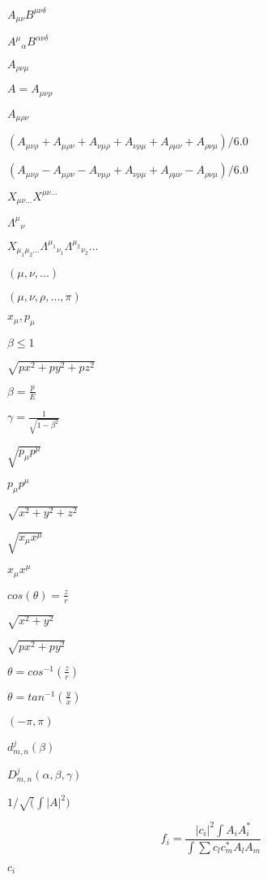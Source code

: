 \documentclass{article}
\begin{document}
$ A_{\mu\nu} B^{\mu\nu\delta} $
\pagebreak

$ A^{\mu}{}_{\alpha} B^{\alpha\nu\delta} $
\pagebreak

$ A_{\rho\nu\mu} $
\pagebreak

$ A = A_{\mu\nu\rho} $
\pagebreak

$ A_{\mu\rho\nu} $
\pagebreak

$ (A_{\mu\nu\rho} + A_{\mu\rho\nu} + A_{\nu\mu\rho} + A_{\nu\rho\mu} + A_{\rho\mu\nu} + A_{\rho\nu\mu})/6.0 $
\pagebreak

$ (A_{\mu\nu\rho} - A_{\mu\rho\nu} - A_{\nu\mu\rho} + A_{\nu\rho\mu} + A_{\rho\mu\nu} - A_{\rho\nu\mu})/6.0 $
\pagebreak

$ X_{\mu\nu...} X^{\mu\nu...} $
\pagebreak

$ \Lambda^{\mu}{}_{\nu}$
\pagebreak

$ X_{\mu_1 \mu_2 ...} \Lambda^{\mu_1}{}_{\nu_1} \Lambda^{\mu_2}{}_{\nu_2} ... $
\pagebreak

$(\mu,\nu,...)$
\pagebreak

$ (\mu,\nu,\rho,...,\pi) $
\pagebreak

$ x_{\mu}, p_{\mu} $
\pagebreak

$ \beta \leq 1 $
\pagebreak

$\sqrt{px^2 + py^2 + pz^2}$
\pagebreak

$ \beta = \frac{p}{E} $
\pagebreak

$ \gamma = \frac{1}{\sqrt{1 - \beta^2}} $
\pagebreak

$ \sqrt{p_{\mu} p^{\mu}} $
\pagebreak

$ p_{\mu} p^{\mu} $
\pagebreak

$\sqrt{x^2 + y^2 + z^2}$
\pagebreak

$ \sqrt{x_{\mu} x^{\mu}} $
\pagebreak

$ x_{\mu} x^{\mu} $
\pagebreak

$ cos(\theta) = \frac{z}{r} $
\pagebreak

$\sqrt{x^2 + y^2}$
\pagebreak

$\sqrt{px^2 + py^2}$
\pagebreak

$ \theta = cos^{-1}(\frac{z}{r}) $
\pagebreak

$ \theta = tan^{-1}(\frac{y}{x}) $
\pagebreak

$ (-\pi,\pi) $
\pagebreak

$d^{j}_{m,n}(\beta)$
\pagebreak

$D^{j}_{m,n}(\alpha,\beta,\gamma)$
\pagebreak

$ 1/\sqrt(\int |A|^2)$
\pagebreak

\[ f_i = \frac{|c_i|^2 \int A_i A_i^*}{\int \sum c_l c_m^* A_l A_m} \]
\pagebreak

$c_i$
\pagebreak
\end{document}
